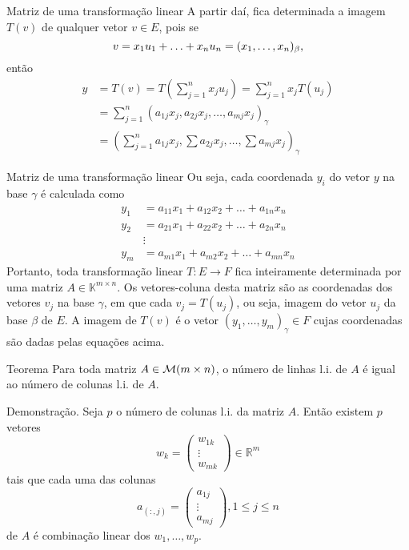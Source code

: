 \documentclass{beamer}
\newcommand{\zerodisplayskips}{%
  \setlength{\abovedisplayskip}{0pt}%
  \setlength{\belowdisplayskip}{0pt}%
  \setlength{\abovedisplayshortskip}{0pt}%
  \setlength{\belowdisplayshortskip}{0pt}}
\begin{document}
\begin{darkframes}
\begin{frame}{Matriz de uma transformação linear}
  A partir daí, fica determinada a imagem $T(v)$ de qualquer vetor $v\in E$, pois se 
  \begin{equation*}
    \zerodisplayskips
    v=x_1u_1+\ldots+x_nu_n = (x_1,\ldots,x_n)_{\beta},
  \end{equation*}
  então
  \begin{align*}
    y &= T(v) = T\left(\sum_{j=1}^n x_ju_j\right) = \sum_{j=1}^n x_jT(u_j) \\
      &= \sum_{j=1}^n \left( a_{1j}x_j,a_{2j}x_j,\ldots,a_{mj}x_j\right)_{\gamma} \\
      &= \left( \sum_{j=1}^n a_{1j}x_j,\sum a_{2j}x_j,\ldots,\sum a_{mj}x_j \right)_{\gamma}
  \end{align*}
\end{frame}

\begin{frame}{Matriz de uma transformação linear}
  Ou seja, cada coordenada $y_i$ do vetor $y$ na base $\gamma$ é calculada como
  \begin{align*}
    y_1 &= a_{11}x_1 + a_{12}x_2 + \ldots + a_{1n}x_n\\
    y_2 &= a_{21}x_1 + a_{22}x_2 + \ldots + a_{2n}x_n\\
        & \vdots  \\
    y_m &= a_{m1}x_1 + a_{m2}x_2 + \ldots + a_{mn}x_n
  \end{align*}
  Portanto, toda transformação linear $T:E \to F$ fica inteiramente determinada por uma matriz $A\in {\mathbb{K}}^{m\times n}$. Os vetores-coluna desta matriz são as coordenadas dos vetores $v_j$ na base $\gamma$, em que cada $v_j=T(u_j)$, ou seja, imagem do vetor $u_j$ da base $\beta$ de $E$. A imagem de $T(v)$ é o vetor $(y_1,\ldots,y_m)_{\gamma}\in F$ cujas coordenadas são dadas pelas equações acima.
\end{frame}

\begin{frame}{}
  \begin{block}{Teorema}
    Para toda matriz $A\in {\cal{M}}(m\times n)$, o número de linhas l.i. de $A$ é igual ao número de colunas l.i. de $A$.
  \end{block}
  \vfill
  \alert{Demonstração.} Seja $p$ o número de colunas l.i. da matriz $A$. Então existem $p$ vetores 
  \begin{equation*}
    w_k =\begin{pmatrix} w_{1k}\\\vdots\\w_{mk}\end{pmatrix} \in {\mathbb{R}}^m
  \end{equation*}
  tais que cada uma das colunas 
  \begin{equation*}
    a_{(:,j)}=\begin{pmatrix}a_{1j}\\\vdots\\a_{mj}\end{pmatrix}, 1\leq j \leq n
  \end{equation*}
  de $A$ é combinação linear dos $w_1,\ldots,w_p$.
\end{frame}


\end{darkframes}
\end{document}
